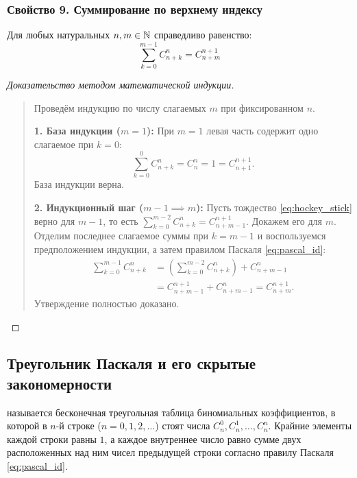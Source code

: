 \subsubsection{Свойство 9. Суммирование по верхнему индексу}

\begin{proposition}
    Для любых натуральных $n, m \in \mathbb{N}$ справедливо равенство:
    \begin{equation} \label{eq:hockey_stick}
        \sum_{k=0}^{m-1} C_{n+k}^n = C_{n+m}^{n+1} \tag{11}
    \end{equation}
\end{proposition}

\begin{proof}[Доказательство методом математической индукции]~\\
    \begin{quote}
        Проведём индукцию по числу слагаемых $m$ при фиксированном $n$.

        \textbf{1. База индукции ($m = 1$):} 
        При $m = 1$ левая часть содержит одно слагаемое при $k = 0$:
        \[
            \sum_{k=0}^{0} C_{n+k}^n = C_n^n = 1 = C_{n+1}^{n+1}.
        \]
        База индукции верна.

        \textbf{2. Индукционный шаг ($m - 1 \implies m$):} 
        Пусть тождество \eqref{eq:hockey_stick} верно для $m - 1$, то есть 
        $\sum_{k=0}^{m-2} C_{n+k}^n = C_{n+m-1}^{n+1}$. Докажем его для $m$. 
        Отделим последнее слагаемое суммы при $k = m - 1$ и воспользуемся 
        предположением индукции, а затем правилом Паскаля 
        \eqref{eq:pascal_id}:
        \begin{align*}
            \sum_{k=0}^{m-1} C_{n+k}^n 
            &= \left(\sum_{k=0}^{m-2} C_{n+k}^n\right) + C_{n+m-1}^n \\
            &= C_{n+m-1}^{n+1} + C_{n+m-1}^n = C_{n+m}^{n+1}.
        \end{align*}
        Утверждение полностью доказано.
    \end{quote}
\end{proof}

\subsection{Треугольник Паскаля и его скрытые закономерности}

\begin{definition}
     называется бесконечная треугольная 
    таблица биномиальных коэффициентов, в которой в $n$-й строке 
    ($n = 0, 1, 2, \dots$) стоят числа $C_n^0, C_n^1, \dots, C_n^n$. 
    Крайние элементы каждой строки равны $1$, а каждое внутреннее число 
    равно сумме двух расположенных над ним чисел предыдущей строки 
    согласно правилу Паскаля \eqref{eq:pascal_id}.
\end{definition}

